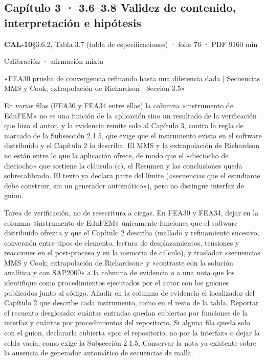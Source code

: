 \subsection{Capítulo 3 · 3.6–3.8 Validez de contenido, interpretación e hipótesis}
\noindent\casilla\textbf{CAL-10}\quad{}\quad §3.6.2, Tabla 3.7 (tabla de especificaciones) · folio 76 · PDF 91\hfill 60 min\par\vspace{1pt}
{\small\color{gris}Calibración · afirmación mixta}\par
\begin{dice}«FEA30 prueba de convergencia refinando hasta una diferencia dada | Secuencias MMS y Cook; extrapolación de Richardson | Sección 3.5»\end{dice}
{\small{}En varias filas (FEA30 y FEA34 entre ellas) la columna «instrumento de EduFEM» no es una función de la aplicación sino un resultado de la verificación que hizo el autor, y la evidencia remite solo al Capítulo 3, contra la regla de marcado de la Subsección 2.1.5, que exige que el instrumento exista en el software distribuido y el Capítulo 2 lo describa. El MMS y la extrapolación de Richardson no están entre lo que la aplicación ofrece, de modo que el «dieciocho de dieciocho» que sostiene la cláusula (c), el Resumen y las conclusiones queda sobrecalibrado. El texto ya declara parte del límite («secuencias que el estudiante debe construir, sin un generador automático»), pero no distingue interfaz de guion.\par}
\begin{debedecir}Tarea de verificación, no de reescritura a ciegas. En FEA30 y FEA34, dejar en la columna «instrumento de EduFEM» únicamente funciones que el software distribuido ofrezca y que el Capítulo 2 describa (mallado y refinamiento sucesivo, conversión entre tipos de elemento, lectura de desplazamientos, tensiones y reacciones en el post-proceso y en la memoria de cálculo), y trasladar «secuencias MMS y Cook; extrapolación de Richardson» y «contraste con la solución analítica y con SAP2000» a la columna de evidencia o a una nota que los identifique como procedimientos ejecutados por el autor con los guiones publicados junto al código. Añadir en la columna de evidencia el localizador del Capítulo 2 que describe cada instrumento, como en el resto de la tabla. Reportar el recuento desglosado: cuántas entradas quedan cubiertas por funciones de la interfaz y cuántas por procedimientos del repositorio. Si alguna fila queda solo con el guion, declararla cubierta «por el repositorio, no por la interfaz» o dejar la celda vacía, como exige la Subsección 2.1.5. Conservar la nota ya existente sobre la ausencia de generador automático de secuencias de malla.\end{debedecir}
